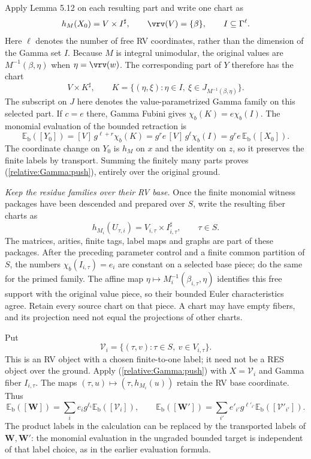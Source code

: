 Apply Lemma 5.12 on each resulting part and write one chart
as
\[
 h_M(X_0)=V\times I^\sharp,\qquad
 \vrv(V)=\{\beta\},\qquad I\subseteq\Gamma^\ell.
\]
Here $\ell$ denotes the number of free RV coordinates,
rather than the dimension of the Gamma set $I$.
Because $M$ is integral unimodular, the original values
are $M^{-1}(\beta,\eta)$ when $\eta=\vrv(w)$.
The corresponding part of $Y$ therefore has the chart
\[
 V\times K^\sharp,\qquad
 K=\{(\eta,\xi):\eta\in I,\
            \xi\in J_{M^{-1}(\beta,\eta)}\}.
\]
The subscript on $J$ here denotes the value-parametrized
Gamma family on this selected part.
If $c=e$ there, Gamma Fubini gives
$\chi_b(K)=e\chi_b(I)$.
The monomial evaluation of the bounded retraction is
\[
 \mathbb E_{\mathrm b}([Y_0])
      =[V]\,g^{\ell+r}\chi_b(K)
      =g^r e\,[V]\,g^\ell\chi_b(I)
      =g^r e\,\mathbb E_{\mathrm b}([X_0]).
\]
The coordinate change on $Y_0$ is $h_M$ on $x$ and the
identity on $z$, so it preserves the finite labels by
transport. Summing the finitely many parts proves
(\ref{relative:Gamma:push}), entirely over the original
ground.

\medskip
\noindent\emph{Keep the residue families over their RV base.}
Once the finite monomial witness packages have been
descended and prepared over $S$, write the resulting
fiber charts as
\[
 h_{M_i}(U_{\tau,i})
      =V_{i,\tau}\times I_{i,\tau}^{\sharp},
 \qquad \tau\in S.
\]
The matrices, arities, finite tags, label maps and graphs
are part of these packages.
After the preceding parameter control and a finite common
partition of $S$, the numbers
$\chi_b(I_{i,\tau})=e_i$ are constant on a selected base
piece; do the same for the primed family.
The affine map
$\eta\mapsto M_i^{-1}(\beta_{i,\tau},\eta)$ identifies
this free support with the original value piece, so their
bounded Euler characteristics agree.
Retain every source chart on that piece. A chart may have
empty fibers, and its projection need not equal the
projections of other charts.

Put
\[
 \mathcal V_i=\{(\tau,v):\tau\in S,\ v\in V_{i,\tau}\}.
\]
This is an RV object with a chosen finite-to-one label;
it need not be a RES object over the ground.
Apply (\ref{relative:Gamma:push}) with
$X=\mathcal V_i$ and Gamma fiber $I_{i,\tau}$.
The maps $(\tau,u)\mapsto(\tau,h_{M_i}(u))$
retain the RV base coordinate. Thus
\begin{equation}\label{fubini:family:coefficients}
 \mathbb E_{\mathrm b}([\bm W])
   =\sum_i e_i g^{\ell_i}
               \mathbb E_{\mathrm b}([\mathcal V_i]),
 \qquad
 \mathbb E_{\mathrm b}([\bm W'])
   =\sum_{i'} e'_{i'}g^{\ell'_{i'}}
               \mathbb E_{\mathrm b}([\mathcal V'_{i'}]).
\end{equation}
The product labels in the calculation can be replaced by
the transported labels of $\bm W,\bm W'$: the monomial
evaluation in the ungraded bounded target is independent
of that label choice, as in the earlier evaluation formula.

